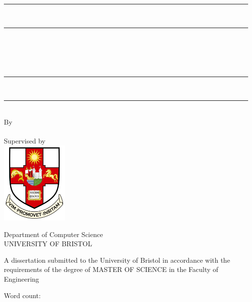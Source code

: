 \begin{titlepage}
    \centering

    \rule{\textwidth}{2pt} \\[-0.4ex]
    \rule{\textwidth}{0.5pt} \\[0.7cm]

    {\LARGE\bfseries \myReportTitle} \\[0.3cm]

    \parbox{0.89\textwidth}{\centering
        {\large \myReportSubtitle}
    } \\[0.3cm]

    \rule{\textwidth}{0.5pt} \\[-0.4ex]
    \rule{\textwidth}{2pt} \\[0.7cm]

    {\large By} \\[0.3cm]
    {\large \myName} \\[0.7cm]
    {\large Supervised by \mySupervisor} \\[1cm]

    \includegraphics[width=0.25\textwidth]{contents/0-preamble/fig00/uob_logo.png} \\[1cm]

    \begin{minipage}{0.6\textwidth} %
        \centering
        {\Large Department of Computer Science} \\[0.3cm]
        {\Large UNIVERSITY OF BRISTOL} \\[0.7cm]
        \begin{flushleft}
            {\normalsize A dissertation submitted to the University of Bristol
                in accordance with the requirements of the degree of MASTER OF
                SCIENCE in the Faculty of Engineering} \\[0.7cm]
        \end{flushleft}
        {\large \mySubmissionMonthYear}
    \end{minipage}
    \vfill

    \vspace{0.5cm}
    \begin{flushright}
        Word count: \wordCount
    \end{flushright}

\end{titlepage}